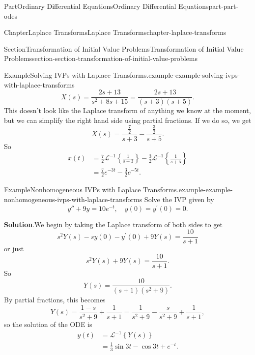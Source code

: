 \documentclass[twoside,10pt,]{book}
\newcommand{\blocktitlefont}{\relax}
\numberwithin{equation}{part}
\newcommand{\iLaplace}[1]{\mathcal{L}^{-1}\set{#1}}
\newcommand{\set}[1]{\left\{ #1 \right\}}
\begin{document}
\begin{partptx}{Part}{Ordinary Differential Equations}{}{Ordinary Differential Equations}{}{}{part-part-odes}
\begin{chapterptx}{Chapter}{Laplace Transforms}{}{Laplace Transforms}{}{}{chapter-laplace-transforms}
\begin{sectionptx}{Section}{Transformation of Initial Value Problems}{}{Transformation of Initial Value Problems}{}{}{section-section-transformation-of-initial-value-problems}
\begin{example}{Example}{Solving IVPs with Laplace Transforms.}{example-example-solving-ivps-with-laplace-transforms}
\begin{equation*}
X(s) = \frac{2s+13}{s^{2}+8s+15} = \frac{2s+13}{(s+3)(s+5)}.
\end{equation*}
This doesn't look like the Laplace transform of anything we know at the moment, but we can simplify the right hand side using partial fractions. If we do so, we get%
\begin{equation*}
X(s) = \frac{\frac{7}{2}}{s+3} - \frac{\frac{3}{2}}{s+5}.
\end{equation*}
So%
\begin{align*}
x(t) &= \frac{7}{2}\mathcal{L}^{-1}\left\{\frac{1}{s+3}\right\} - \frac{3}{2}\mathcal{L}^{-1}\left\{\frac{1}{s+5}\right\}\\
&= \frac{7}{2}e^{-3t} - \frac{3}{2}e^{-5t}\text{.}
\end{align*}
%
\end{example}
\begin{example}{Example}{Nonhomogeneous IVPs with Laplace Transforms.}{example-example-nonhomogeneous-ivps-with-laplace-transforms}%
Solve the IVP given by%
\begin{equation*}
y''+9y = 10e^{-t},\quad y(0) = y^\prime(0) = 0.
\end{equation*}
%
\par\smallskip%
\noindent\textbf{\blocktitlefont Solution}.\hypertarget{solution-example-nonhomogeneous-ivps-with-laplace-transforms-c}{}\quad{}We begin by taking the Laplace transform of both sides to get%
\begin{equation*}
s^{2}Y(s) - sy(0) - y^\prime(0) + 9Y(s) = \frac{10}{s+1}
\end{equation*}
or just%
\begin{equation*}
s^{2}Y(s) + 9Y(s) = \frac{10}{s+1}.
\end{equation*}
So%
\begin{equation*}
Y(s) = \frac{10}{(s+1)(s^{2}+9)}.
\end{equation*}
By partial fractions, this becomes%
\begin{equation*}
Y(s) = \frac{1-s}{s^{2}+9} + \frac{1}{s+1} = \frac{1}{s^{2}+9} - \frac{s}{s^{2}+9} + \frac{1}{s+1},
\end{equation*}
so the solution of the ODE is%
\begin{align*}
y(t) & = \iLaplace{Y(s)}\\
&= \frac{1}{3}\sin3t -\cos3t + e^{-t}\text{.}
\end{align*}
%
\end{example}
\begin{sageinput}

\end{sageinput}
\end{sectionptx}
\end{chapterptx}
\end{partptx}
\end{document}
